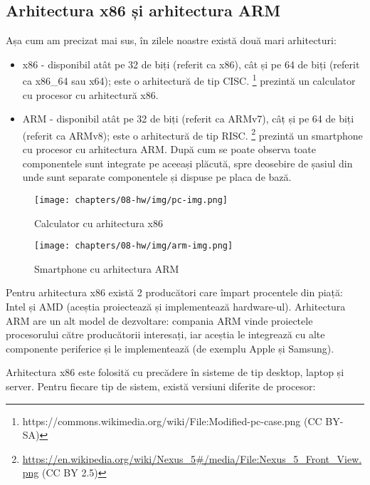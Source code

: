 \subsection{Arhitectura x86 și arhitectura ARM}
\label{sec:hw:class:x86-arm}

Așa cum am precizat mai sus, în zilele noastre există două mari arhitecturi:

\begin{itemize}
  \item x86 - disponibil atât pe 32 de biți (referit ca x86), cât și pe 64 de biți (referit ca x86\_64 sau x64);
    este o arhitectură de tip CISC.
    \footnote{https://commons.wikimedia.org/wiki/File:Modified-pc-case.png (CC BY-SA)} prezintă un calculator cu procesor cu arhitectură x86.
  \item ARM - disponibil atât pe 32 de biți (referit ca ARMv7), câț și pe 64 de biți (referit ca ARMv8);
    este o arhitectură de tip RISC.
    \footnote{\url{https://en.wikipedia.org/wiki/Nexus_5\#/media/File:Nexus_5_Front_View.png} (CC BY 2.5)} prezintă un smartphone cu procesor cu arhitectura ARM.
    După cum se poate observa toate componentele sunt integrate pe aceeași plăcută, spre deosebire de șasiul din  unde sunt separate componentele și dispuse pe placa de bază.
\end{itemize}

\begin{figure}[!htbp]
  \centering
  \texttt{[image: chapters/08-hw/img/pc-img.png]}
  \caption{Calculator cu arhitectura x86}
  \label{fig:hw:x86}
\end{figure}

\begin{figure}[!htbp]
  \centering
  \texttt{[image: chapters/08-hw/img/arm-img.png]}
  \caption{Smartphone cu arhitectura ARM}
  \label{fig:hw:arm}
\end{figure}

Pentru arhitectura x86 există 2 producători care împart procentele din piață: Intel și AMD (aceștia proiectează și implementează hardware-ul).
Arhitectura ARM are un alt model de dezvoltare: compania ARM vinde proiectele procesorului către producătorii interesați, iar aceștia le integrează cu alte componente periferice și le implementează (de exemplu Apple și Samsung).

Arhitectura x86 este folosită cu precădere în sisteme de tip desktop, laptop și server.
Pentru fiecare tip de sistem, există versiuni diferite de procesor:

